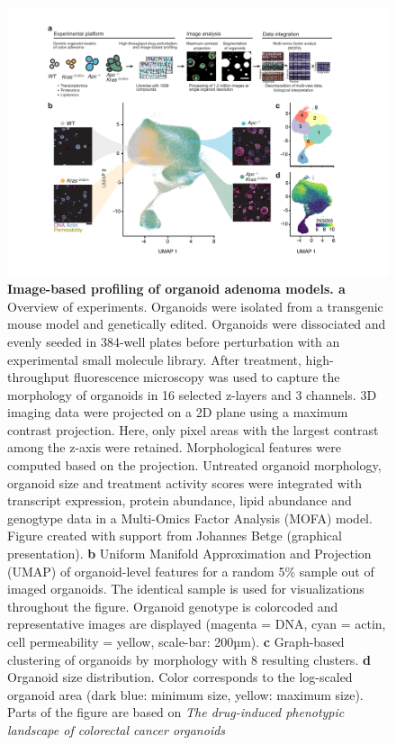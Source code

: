 \begin{flushleft}
\begin{figure}[h!]
\centering
\includegraphics[width=\textwidth,
                height=\textheight,
                keepaspectratio]{figures/adenomaprofiling/pdf/fig_1_2.pdf}
\caption[Image-based profiling of organoid adenoma models]{\textbf{Image-based profiling of organoid adenoma models. a} Overview of experiments. Organoids were isolated from a transgenic mouse model and genetically edited. Organoids were dissociated and evenly seeded in 384-well plates before perturbation with an experimental small molecule library. After treatment, high-throughput fluorescence microscopy was used to capture the morphology of organoids in 16 selected z-layers and 3 channels. 3D imaging data were projected on a 2D plane using a maximum contrast projection. Here, only pixel areas with the largest contrast among the z-axis were retained. Morphological features were computed based on the projection. Untreated organoid morphology, organoid size and treatment activity scores were integrated with transcript expression, protein abundance, lipid abundance and genogtype data in a Multi-Omics Factor Analysis (MOFA) model. Figure created with support from Johannes Betge (graphical presentation). 
\textbf{b} Uniform Manifold Approximation and Projection (UMAP) of organoid-level features for a random 5\% sample out of imaged organoids. The identical sample is used for visualizations throughout the figure. Organoid genotype is colorcoded and representative images are displayed (magenta = DNA, cyan = actin, cell permeability = yellow, scale-bar: 200µm). \textbf{c} Graph-based clustering of organoids by morphology with 8 resulting clusters. \textbf{d} Organoid size distribution. Color corresponds to the log-scaled organoid area (dark blue: minimum size, yellow: maximum size). Parts of the figure are based on \textit{The drug-induced phenotypic landscape of colorectal cancer organoids} \parencite{betgeDruginducedPhenotypicLandscape2022}}
\label{fig_120}
\end{figure}
\bigbreak


\end{flushleft}
